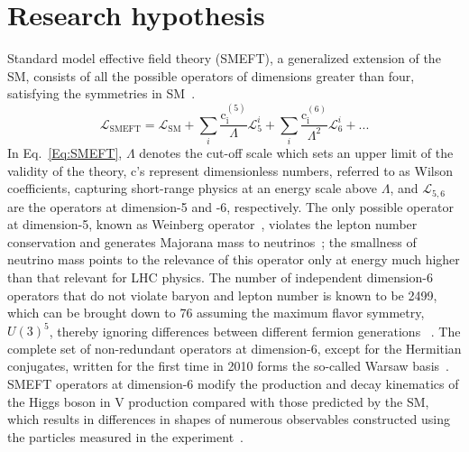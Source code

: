 \documentclass[a4paper,11pt]{article}
\newcommand{\Pb}{{{\Pqb}}\xspace}
\newcommand{\PAb}{{{{\Paqb}}}\xspace}
\renewcommand{\PV}{{{{V}}}\xspace}
\newcommand{\VH}{{{\PV}{\PH}}\xspace}
\begin{document}
\section{Research hypothesis}
\label{sec:research_hypo}


Standard model effective field theory (SMEFT), a generalized extension of the SM, consists of all the possible operators of dimensions greater than four, satisfying the symmetries in SM~\cite{Jenkins:2013zja,Alonso:2013hga,Jenkins:2013wua,Englert:2014cva,Brivio:2017vri}. 
\begin{equation}
\mathcal{L}_{\text{SMEFT}} = \mathcal{L}_{\text{SM}} +  {\sum}_{i} \frac{\text{c}_\text{i}^{\left(5\right)}}{\Lambda} \mathcal{L}_{5}^{i} + {\sum}_{i} \frac{\text{c}_\text{i}^{\left(6\right)}}{{\Lambda}^{2}} \mathcal{L}_{6}^{i} + ...
\label{Eq:SMEFT}
\end{equation}
In Eq.~\eqref{Eq:SMEFT}, $\Lambda$ denotes the cut-off scale which sets an upper limit of the validity of the theory, $\text{c}$'s represent dimensionless numbers, referred to as Wilson coefficients, capturing short-range physics at an energy scale above $\Lambda$, and $\mathcal{L}_{5,6}$ are the operators at dimension-5 and -6, respectively.
The only possible operator at dimension-5, known as Weinberg operator~\cite{PhysRevLett.43.1566}, violates the lepton number conservation and generates Majorana mass to neutrinos~\cite{Bonnet:2009ej}; 
the smallness of neutrino mass points to the relevance of this operator only at energy much higher than that relevant for LHC physics. 
The number of independent dimension-6 operators that do not violate baryon and lepton number is known to be 2499,
which can be brought down to 76 assuming the maximum flavor symmetry, $U(3)^5$, 
thereby ignoring differences between different fermion generations
~\cite{Alonso:2013hga}.
The complete set of non-redundant operators at  dimension-6, except for the Hermitian conjugates, written for the first time in 2010 forms the so-called Warsaw basis~\cite{Grzadkowski:2010es}. 
SMEFT operators at dimension-6 modify the production and decay kinematics of the Higgs boson in \VH production compared with those predicted by the SM, which results in differences in shapes of numerous observables constructed using the particles measured in the experiment~\cite{Hagiwara:1993qt,Ellis:2014dva,Murphy:2017omb,Baglio:2020oqu}. 
\end{document}
